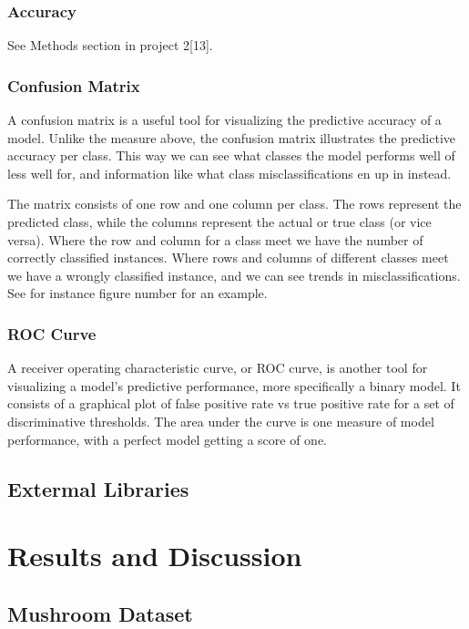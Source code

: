 \documentclass[11pt]{article}
\begin{document}
\hypertarget{accuracy}{%
\subsubsection{Accuracy}\label{accuracy}}
See Methods section in project 2[13].
\hypertarget{confusion-matrix}{%
\subsubsection{Confusion Matrix}\label{confusion-matrix}}
A confusion matrix is a useful tool for visualizing the predictive accuracy of a model. Unlike the measure above, the confusion matrix illustrates the predictive accuracy per class. This way we can see what classes the model performs well of less well for, and information like what class misclassifications en up in instead.

The matrix consists of one row and one column per class. The rows represent the predicted class, while the columns represent the actual or true class (or vice versa). Where the row and column for a class meet we have the number of correctly classified instances. Where rows and columns of different classes meet we have a wrongly classified instance, and we can see trends in misclassifications. See for instance figure number for an example. 

\hypertarget{roc-curve}{%
\subsubsection{ROC Curve}\label{roc-curve}}
A receiver operating characteristic curve, or ROC curve, is another tool for visualizing a model's predictive performance, more specifically a binary model. It consists of a graphical plot of false positive rate vs true positive rate for a set of discriminative thresholds. The area under the curve is one measure of model performance, with a perfect model getting a score of one.

\hypertarget{ext-lib}{%
	\subsection{Extermal Libraries}\label{ext-lib}}

\hypertarget{results-and-discussion}{%
\section{Results and Discussion}\label{results-and-discussion}}


\hypertarget{mushroom-dataset}{%
	\subsection{Mushroom Dataset}\label{mushroom-dataset}}
\end{document}
